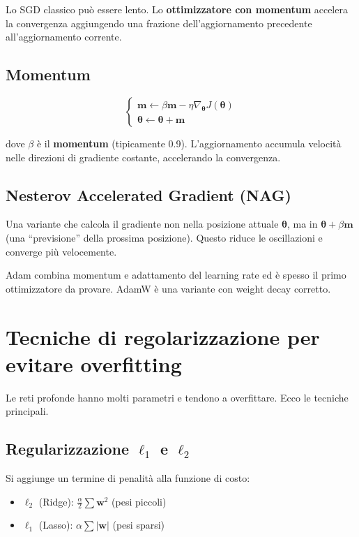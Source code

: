 Lo SGD classico può essere lento. Lo \textbf{ottimizzatore con momentum} accelera la convergenza aggiungendo una frazione dell'aggiornamento precedente all'aggiornamento corrente.

\subsection{Momentum}

\begin{equation}
\begin{cases}
\mathbf{m} \leftarrow \beta \mathbf{m} - \eta \nabla_{\boldsymbol{\theta}} J(\boldsymbol{\theta}) \\
\boldsymbol{\theta} \leftarrow \boldsymbol{\theta} + \mathbf{m}
\end{cases}
\end{equation}

dove $\beta$ è il \textbf{momentum} (tipicamente 0.9). L'aggiornamento accumula velocità nelle direzioni di gradiente costante, accelerando la convergenza.

\subsection{Nesterov Accelerated Gradient (NAG)}

Una variante che calcola il gradiente non nella posizione attuale $\boldsymbol{\theta}$, ma in $\boldsymbol{\theta} + \beta \mathbf{m}$ (una ``previsione'' della prossima posizione). Questo riduce le oscillazioni e converge più velocemente.

\begin{notebox}[Adam]
Adam combina momentum e adattamento del learning rate ed è spesso il primo ottimizzatore da provare. AdamW è una variante con weight decay corretto.
\end{notebox}

\section{Tecniche di regolarizzazione per evitare overfitting}

Le reti profonde hanno molti parametri e tendono a overfittare. Ecco le tecniche principali.

\subsection{Regularizzazione $\ell_1$ e $\ell_2$}

Si aggiunge un termine di penalità alla funzione di costo:
\begin{itemize}
    \item $\ell_2$ (Ridge): $\frac{\alpha}{2} \sum \mathbf{w}^2$ (pesi piccoli)
    \item $\ell_1$ (Lasso): $\alpha \sum |\mathbf{w}|$ (pesi sparsi)
\end{itemize}

